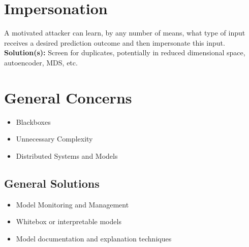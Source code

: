 \documentclass[fleqn]{article}
\begin{document}
\section{Impersonation}

A motivated attacker can learn, by any number of means, what type of input receives a desired prediction outcome and then impersonate this input. \\

\noindent\textbf{Solution(s):} Screen for duplicates, potentially in reduced dimensional space, autoencoder, MDS, etc.

\section{General Concerns}

\begin{itemize}
\item Blackboxes
\item Unnecessary Complexity
\item Distributed Systems and Models
\end{itemize}

\subsection{General Solutions}

\begin{itemize}
\item Model Monitoring and Management 
\item Whitebox or interpretable models
\item Model documentation and explanation techniques
\end{itemize}
\end{document}
